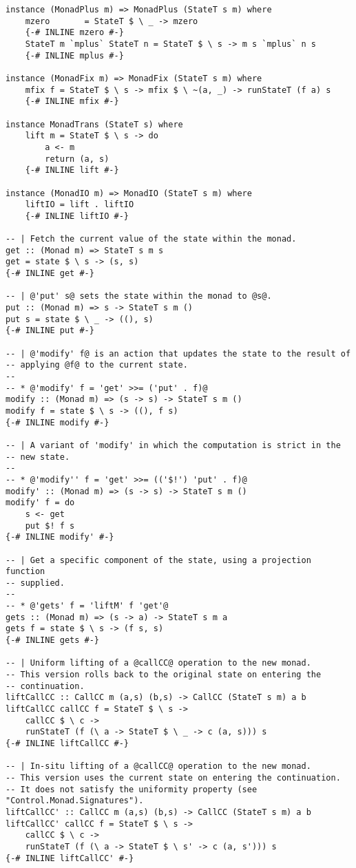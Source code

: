 \begin{lstlisting}
instance (MonadPlus m) => MonadPlus (StateT s m) where
    mzero       = StateT $ \ _ -> mzero
    {-# INLINE mzero #-}
    StateT m `mplus` StateT n = StateT $ \ s -> m s `mplus` n s
    {-# INLINE mplus #-}

instance (MonadFix m) => MonadFix (StateT s m) where
    mfix f = StateT $ \ s -> mfix $ \ ~(a, _) -> runStateT (f a) s
    {-# INLINE mfix #-}

instance MonadTrans (StateT s) where
    lift m = StateT $ \ s -> do
        a <- m
        return (a, s)
    {-# INLINE lift #-}

instance (MonadIO m) => MonadIO (StateT s m) where
    liftIO = lift . liftIO
    {-# INLINE liftIO #-}

-- | Fetch the current value of the state within the monad.
get :: (Monad m) => StateT s m s
get = state $ \ s -> (s, s)
{-# INLINE get #-}

-- | @'put' s@ sets the state within the monad to @s@.
put :: (Monad m) => s -> StateT s m ()
put s = state $ \ _ -> ((), s)
{-# INLINE put #-}

-- | @'modify' f@ is an action that updates the state to the result of
-- applying @f@ to the current state.
--
-- * @'modify' f = 'get' >>= ('put' . f)@
modify :: (Monad m) => (s -> s) -> StateT s m ()
modify f = state $ \ s -> ((), f s)
{-# INLINE modify #-}

-- | A variant of 'modify' in which the computation is strict in the
-- new state.
--
-- * @'modify'' f = 'get' >>= (('$!') 'put' . f)@
modify' :: (Monad m) => (s -> s) -> StateT s m ()
modify' f = do
    s <- get
    put $! f s
{-# INLINE modify' #-}

-- | Get a specific component of the state, using a projection function
-- supplied.
--
-- * @'gets' f = 'liftM' f 'get'@
gets :: (Monad m) => (s -> a) -> StateT s m a
gets f = state $ \ s -> (f s, s)
{-# INLINE gets #-}

-- | Uniform lifting of a @callCC@ operation to the new monad.
-- This version rolls back to the original state on entering the
-- continuation.
liftCallCC :: CallCC m (a,s) (b,s) -> CallCC (StateT s m) a b
liftCallCC callCC f = StateT $ \ s ->
    callCC $ \ c ->
    runStateT (f (\ a -> StateT $ \ _ -> c (a, s))) s
{-# INLINE liftCallCC #-}

-- | In-situ lifting of a @callCC@ operation to the new monad.
-- This version uses the current state on entering the continuation.
-- It does not satisfy the uniformity property (see "Control.Monad.Signatures").
liftCallCC' :: CallCC m (a,s) (b,s) -> CallCC (StateT s m) a b
liftCallCC' callCC f = StateT $ \ s ->
    callCC $ \ c ->
    runStateT (f (\ a -> StateT $ \ s' -> c (a, s'))) s
{-# INLINE liftCallCC' #-}


\end{lstlisting}

